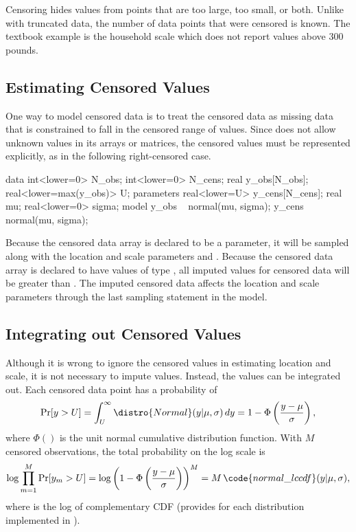 Censoring hides values from points that are too large, too small, or
both.  Unlike with truncated data, the number of data points that were
censored is known.  The textbook example is the household scale which
does not report values above 300 pounds.  

\subsection{Estimating Censored Values}

One way to model censored data is to treat the censored data as
missing data that is constrained to fall in the censored range of
values.  Since \Stan does not allow unknown values in its arrays or
matrices, the censored values must be represented explicitly, as in the
following right-censored case.
%
\begin{stancode}
data {
  int<lower=0> N_obs;
  int<lower=0> N_cens;
  real y_obs[N_obs];
  real<lower=max(y_obs)> U;
}
parameters {
  real<lower=U> y_cens[N_cens];
  real mu;
  real<lower=0> sigma;
}
model {
  y_obs ~ normal(mu, sigma);
  y_cens ~ normal(mu, sigma);
}
\end{stancode}
%
Because the censored data array  is declared to be a parameter, it
will be sampled along with the location and scale parameters 
and .  Because the censored data array  is
declared to have values of type , all imputed values
for censored data will be greater than .  The imputed censored
data affects the location and scale parameters through the last
sampling statement in the model.  

\subsection{Integrating out Censored Values}

Although it is wrong to ignore the censored values in estimating
location and scale, it is not necessary to impute values.  Instead,
the values can be integrated out.  Each censored data point has a
probability of
%
\[
\mbox{Pr}[y > U] 
= \int_U^{\infty} \distro{Normal}(y|\mu,\sigma) \, dy
= 1 - \Phi\left(\frac{y - \mu}{\sigma}\right),
\]
%
where $\Phi()$ is the unit normal cumulative distribution function.
With $M$ censored observations, the total probability on the log scale
is
\[
\log \prod_{m=1}^M \mbox{Pr}[y_m > U]
= \log \left( 1 - \Phi\left(\frac{y - \mu}{\sigma}\right)\right)^{M}
= M \, \code{normal\_lccdf}(y | \mu, \sigma),
\]
%
where  is the log of complementary CDF
(\Stan provides  for each distribution
implemented in \Stan).

